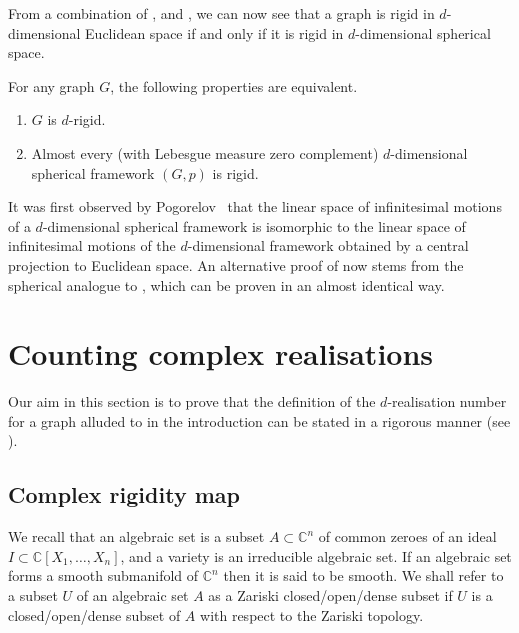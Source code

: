 From a combination of ,  and ,
we can now see that a graph is rigid in $d$-dimensional Euclidean space if and only if it is rigid in $d$-dimensional spherical space.

\begin{theorem}\label{t:sphereclassic}
	For any graph $G$, the following properties are equivalent.
	\begin{enumerate}
		\item $G$ is $d$-rigid.
		\item Almost every (\ie with Lebesgue measure zero complement) $d$-dimensional spherical framework $(G,p)$ is rigid.
	\end{enumerate}
\end{theorem}

\begin{remark}
	It was first observed by Pogorelov~\cite[Chapter V]{Pog73} that the linear space of infinitesimal motions of a $d$-dimensional spherical framework is isomorphic to the linear space of infinitesimal motions of the $d$-dimensional framework obtained by a central projection to Euclidean space.
	An alternative proof of  now stems from the spherical analogue to ,
	which can be proven in an almost identical way.
\end{remark}


\section{Counting complex realisations}\label{sec:count}

Our aim in this section is to prove that the definition of the $d$-realisation number for a graph alluded to in the introduction can be stated in a rigorous manner (see ).

\subsection{Complex rigidity map}

We recall that an algebraic set is a subset $A \subset \mathbb{C}^n$ of common zeroes of an ideal $I \subset \mathbb{C}[X_1,\ldots,X_n]$,
and a variety is an irreducible algebraic set.
If an algebraic set forms a smooth submanifold of $\mathbb{C}^n$ then it is said to be smooth.
We shall refer to a subset $U$ of an algebraic set $A$ as a Zariski closed/open/dense subset if $U$ is a closed/open/dense subset of $A$ with respect to the Zariski topology.

